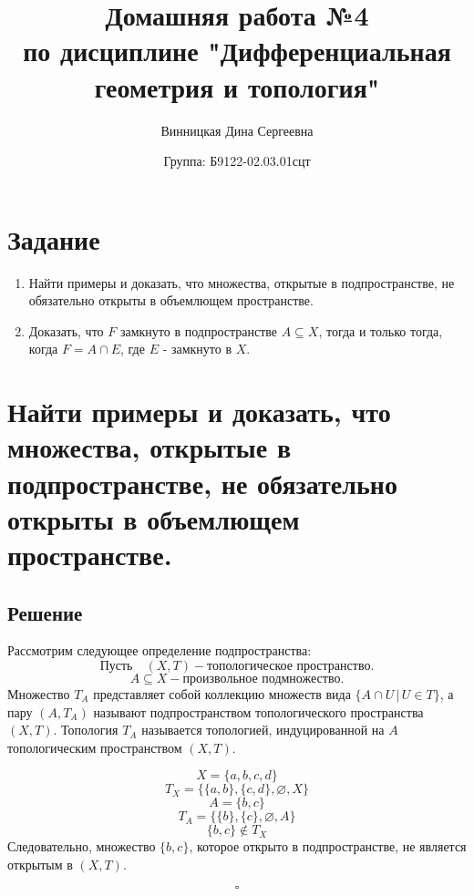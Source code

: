 \documentclass{article}
\title{\vspace{-1cm}Домашняя работа №4 \\ по дисциплине "Дифференциальная геометрия и топология"}
\author{Винницкая Дина Сергеевна}
\date{Группа: Б9122-02.03.01сцт}
\begin{document}
	
	\maketitle

        \section{Задание} 

     \begin{enumerate}
        \item Найти примеры и доказать, что множества, открытые в подпространстве, не обязательно открыты в объемлющем пространстве.
        \item Доказать, что \( F \) замкнуто в подпространстве \( A \subseteq X \), тогда и только тогда, когда \( F = A \cap E \), где \( E \) - замкнуто в \( X \).
    \end{enumerate}


        \section*{Найти примеры и доказать, что множества, открытые в подпространстве, не обязательно открыты в объемлющем пространстве.} 
        

        \subsection*{Решение}
        Рассмотрим следующее определение подпространства:
        \[
        \text{Пусть} \quad (X, T) - \text{топологическое пространство}.
        \]
        \[
        A \subseteq X - \text{произвольное подмножество}.
        \]
        Множество \( T_A \) представляет собой коллекцию множеств вида \( \{A \cap U \, | \, U \in T \} \), 
        а пару \( (A, T_A) \) называют подпространством топологического пространства \( (X, T) \).
        Топология \( T_A \) называется топологией, индуцированной на \( A \) топологическим пространством \( (X, T) \).

        
        \[
        X = \{a, b, c, d\}
        \]
        \[
        T_X = \{\{a, b\}, \{c, d\}, \varnothing, X\}
        \]
        \[
        A = \{b, c\}
        \]
        \[
        T_A = \{\{b\}, \{c\}, \varnothing, A\}
        \]
        \[
        \{b, c\} \notin T_X
        \]
        Следовательно, множество \( \{b, c\} \), которое открыто в подпространстве, не является открытым в \( (X, T) \). 
        
        \[
        \square
        \]
        
\end{document}
